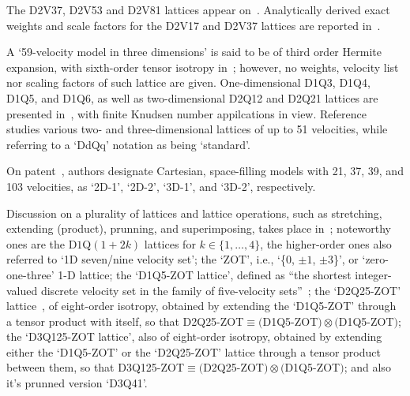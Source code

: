     The D2V37, D2V53 and D2V81 lattices appear on~\cite{2007-PhilippiPC+DosSantosLOE-IntJModPhysC}. Analytically  derived  exact
    weights and scale factors for the D2V17 and D2V37 lattices are reported in~\cite{2007-SiebertDN+PhilippiPC-IntJModPhysC}.

    A `59-velocity model in three dimensions' is said to be of third order Hermite expansion, with sixth-order  tensor  isotropy
    in~\cite{2008-ChenH+ShanX-PhysD}; however, no weights, velocity  list  nor  scaling  factors  of  such  lattice  are  given.
    One-dimensional  D1Q3,  D1Q4,  D1Q5,  and  D1Q6,  as  well  as  two-dimensional  D2Q12  and  D2Q21  lattices  are  presented
    in~\cite{2008-KimSH+BoydID-JComputPhys},      with      finite      Knudsen      number      appilcations      in      view.
    Reference~\cite{2008-RubinsteinR+LuoLS-PhysRev} studies various two- and three-dimensional lattices of up to 51  velocities,
    while referring to a `DdQq' notation as being `standard'.

    On patent~\cite{2008-ShanX+ZhangR-USPat}, authors designate Cartesian,  space-filling  models  with  21,  37,  39,  and  103
    velocities, as `2D-1', `2D-2', `3D-1', and `3D-2', respectively.

    Discussion on a plurality of lattices and lattice  operations,  such  as  stretching,  extending  (product),  prunning,  and
    superimposing, takes place in~\cite{2009-ChikatamarlaSS+KarlinIV-PhysRevE}; noteworthy ones are the  D$1$Q$(1+2k)$  lattices
    for $k \in \{1, \ldots, 4\}$, the higher-order ones also referred to `1D seven/nine velocity set'; the `ZOT', i.e.,  `\{$0$,
    $\pm 1$, $\pm 3$\}', or  `zero-one-three'  1-D  lattice;  the  `D1Q5-ZOT  lattice',  defined  as  ``{\swshape  the  shortest
    integer-valued        discrete        velocity        set        in        the        family        of         five-velocity
    sets\/}''~\cite{2006-ChikatamarlaSS+KarlinIV-PhysRevLett};                          the                          `D2Q25-ZOT'
    lattice~\cite{2008-ChikatamarlaSS+KarlinIV-CompPhysComm}, of eight-order isotropy,  obtained  by  extending  the  `D1Q5-ZOT'
    through a tensor product with itself, so that D2Q25-ZOT$\equiv($D1Q5-ZOT$) \otimes ($D1Q5-ZOT$)$; the `D3Q125-ZOT  lattice',
    also of eight-order iso\-tro\-py, obtained by extending either the `D1Q5-ZOT' or the `D2Q25-ZOT' lattice  through  a  tensor
    product between them, so that D3Q125-ZOT$\equiv($D2Q25-ZOT$) \otimes ($D1Q5-ZOT$)$; and also it's prunned version `D3Q41'.









